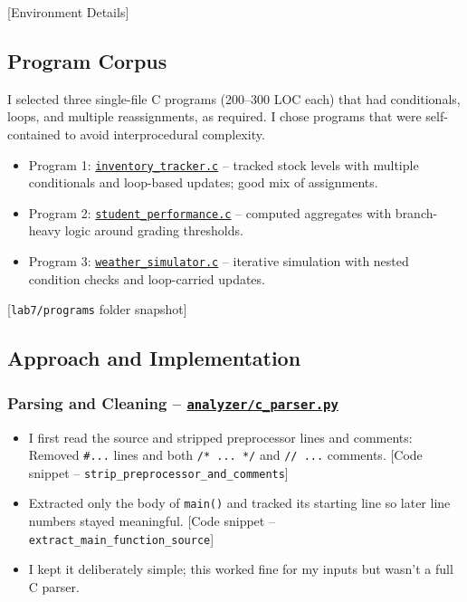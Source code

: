 [Environment Details]

\subsection{Program Corpus}

I selected three single-file C programs (200--300 LOC each) that had conditionals, loops, and multiple reassignments, as required. I chose programs that were self-contained to avoid interprocedural complexity.

\begin{itemize}[itemsep=0em, topsep=0pt]
    \item Program 1: \href{https://github.com/ShardulJunagade/cs202-stt/tree/main/lab7/programs/inventory_tracker.c}{\texttt{inventory\_tracker.c}} -- tracked stock levels with multiple conditionals and loop-based updates; good mix of assignments.
    \item Program 2: \href{https://github.com/ShardulJunagade/cs202-stt/tree/main/lab7/programs/student_performance.c}{\texttt{student\_performance.c}} -- computed aggregates with branch-heavy logic around grading thresholds.
    \item Program 3: \href{https://github.com/ShardulJunagade/cs202-stt/tree/main/lab7/programs/weather_simulator.c}{\texttt{weather\_simulator.c}} -- iterative simulation with nested condition checks and loop-carried updates.
\end{itemize}

[\texttt{lab7/programs} folder snapshot]

\subsection{Approach and Implementation}

\subsubsection{Parsing and Cleaning -- \href{https://github.com/ShardulJunagade/cs202-stt/tree/main/lab7/analyzer/c_parser.py}{\texttt{analyzer/c\_parser.py}}}
\begin{itemize}[itemsep=0em, topsep=0pt]
    \item I first read the source and stripped preprocessor lines and comments:
    Removed \texttt{\#...} lines and both \texttt{/* ... */} and \texttt{// ...} comments.
    [Code snippet -- \texttt{strip\_preprocessor\_and\_comments}]
    \item Extracted only the body of \texttt{main()} and tracked its starting line so later line numbers stayed meaningful.
    [Code snippet -- \texttt{extract\_main\_function\_source}]
    \item I kept it deliberately simple; this worked fine for my inputs but wasn’t a full C parser.
\end{itemize}

